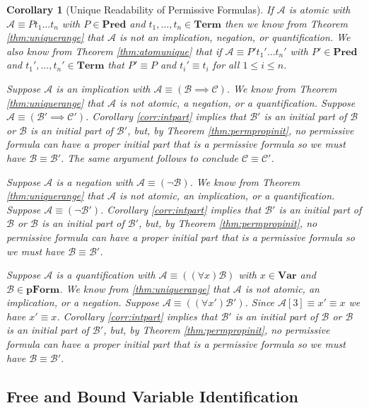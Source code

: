 \documentclass[12pt]{article}
\theoremstyle{break}
\theoremstyle{break}
\theoremstyle{break}
\newtheorem{corollary}[theorem]{Corollary}
\theoremstyle{break}
\newcommand{\mc}[1]{\mathcal{#1}}
\begin{document}
\begin{corollary}[Unique Readability of Permissive Formulas]
If $\mc{A}$ is atomic with $\mc{A}\equiv Pt_1\ldots t_n$ with $P\in \textbf{Pred}$ and $t_1, \ldots, t_n \in \textbf{Term}$ then we know from Theorem \ref{thm:uniquerange} that $\mc{A}$ is not an implication, negation, or quantification.
We also know from Theorem \ref{thm:atomunique} that if $\mc{A} \equiv P't_1'\ldots t_n'$ with $P'\in\textbf{Pred}$ and $t_1',\ldots, t_n'\in\textbf{Term}$ that $P' \equiv P$ and $t_i' \equiv t_i$ for all $1 \le i \le n$.

Suppose $\mc{A}$ is an implication with $\mc{A} \equiv (\mc{B} \implies \mc{C})$.
We know from Theorem \ref{thm:uniquerange} that $\mc{A}$ is not atomic, a negation, or a quantification.
Suppose $\mc{A} \equiv (\mc{B}'\implies \mc{C}')$.
Corollary \ref{corr:intpart} implies that $\mc{B}'$ is an initial part of $\mc{B}$ or $\mc{B}$ is an initial part of $\mc{B}'$, but, by Theorem \ref{thm:permpropinit}, no permissive formula can have a proper initial part that is a permissive formula so we must have $\mc{B} \equiv \mc{B}'$. 
The same argument follows to conclude $\mc{C} \equiv \mc{C}'$.

Suppose $\mc{A}$ is a negation with $\mc{A} \equiv (\lnot \mc{B})$.
We know from Theorem \ref{thm:uniquerange} that $\mc{A}$ is not atomic, an implication, or a quantification.
Suppose $\mc{A} \equiv (\lnot \mc{B}')$.
Corollary \ref{corr:intpart} implies that $\mc{B}'$ is an initial part of $\mc{B}$ or $\mc{B}$ is an initial part of $\mc{B}'$, but, by Theorem \ref{thm:permpropinit}, no permissive formula can have a proper initial part that is a permissive formula so we must have $\mc{B} \equiv \mc{B}'$. 

Suppose $\mc{A}$ is a quantification with $\mc{A} \equiv ((\forall x) \mc{B})$ with $x \in \textbf{Var}$ and $\mc{B}\in\textbf{pForm}$.
We know from \ref{thm:uniquerange} that $\mc{A}$ is not atomic, an implication, or a negation.
Suppose $\mc{A} \equiv ((\forall x') \mc{B}')$.
Since $\mc{A}[3] \equiv x' \equiv x$ we have $x' \equiv x$.
Corollary \ref{corr:intpart} implies that $\mc{B}'$ is an initial part of $\mc{B}$ or $\mc{B}$ is an initial part of $\mc{B}'$, but, by Theorem \ref{thm:permpropinit}, no permissive formula can have a proper initial part that is a permissive formula so we must have $\mc{B} \equiv \mc{B}'$. 
\end{corollary}

\subsection{Free and Bound Variable Identification}
\end{document}
